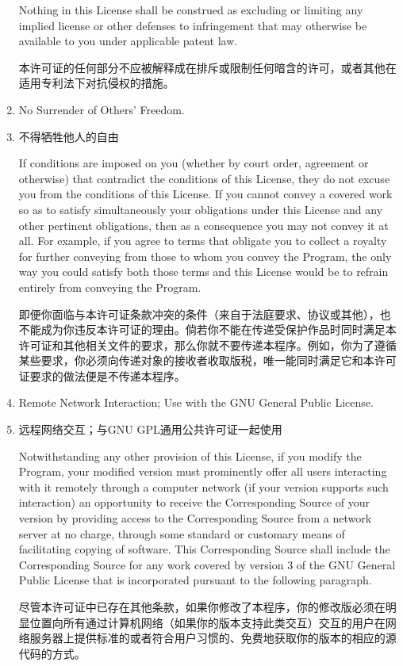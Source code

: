 \documentclass[11pt]{article}
\begin{document}
\begin{enumerate}
Nothing in this License shall be construed as excluding or limiting
any implied license or other defenses to infringement that may
otherwise be available to you under applicable patent law.

本许可证的任何部分不应被解释成在排斥或限制任何暗含的许可，或者其他在适用专利法下对抗侵权的措施。

\item No Surrender of Others' Freedom.
\item 不得牺牲他人的自由

If conditions are imposed on you (whether by court order, agreement or
otherwise) that contradict the conditions of this License, they do not
excuse you from the conditions of this License.  If you cannot convey a
covered work so as to satisfy simultaneously your obligations under this
License and any other pertinent obligations, then as a consequence you may
not convey it at all.  For example, if you agree to terms that obligate you
to collect a royalty for further conveying from those to whom you convey
the Program, the only way you could satisfy both those terms and this
License would be to refrain entirely from conveying the Program.

即便你面临与本许可证条款冲突的条件（来自于法庭要求、协议或其他），也不能成为你违反本许可证的理由。倘若你不能在传递受保护作品时同时满足本许可证和其他相关文件的要求，那么你就不要传递本程序。例如，你为了遵循某些要求，你必须向传递对象的接收者收取版税，唯一能同时满足它和本许可证要求的做法便是不传递本程序。

\item Remote Network Interaction; Use with the GNU General Public License.
\item 远程网络交互；与GNU GPL通用公共许可证一起使用

Notwithstanding any other provision of this License, if you modify the
Program, your modified version must prominently offer all users interacting
with it remotely through a computer network (if your version supports such
interaction) an opportunity to receive the Corresponding Source of your
version by providing access to the Corresponding Source from a network
server at no charge, through some standard or customary means of
facilitating copying of software.  This Corresponding Source shall include
the Corresponding Source for any work covered by version 3 of the GNU
General Public License that is incorporated pursuant to the following
paragraph.

尽管本许可证中已存在其他条款，如果你修改了本程序，你的修改版必须在明显位置向所有通过计算机网络（如果你的版本支持此类交互）交互的用户在网络服务器上提供标准的或者符合用户习惯的、免费地获取你的版本的相应的源代码的方式。


\end{enumerate}
\end{document}
